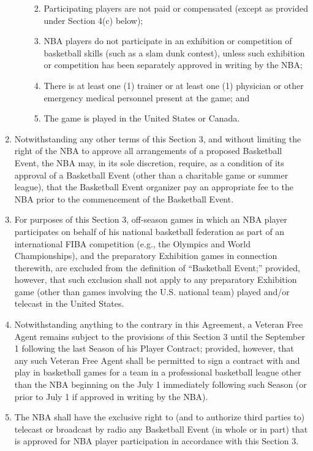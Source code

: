\documentclass[
]{book}
\providecommand{\tightlist}{%
  \setlength{\itemsep}{0pt}\setlength{\parskip}{0pt}}
\begin{document}
\begin{enumerate}
\begin{enumerate}
    \begin{enumerate}
    \def\labelenumiii{(\arabic{enumiii})}
    \tightlist
    \item
      Participating players are not paid or compensated (except as provided under Section 4(c) below);
    \item
      NBA players do not participate in an exhibition or competition of basketball skills (such as a slam dunk contest), unless such exhibition or competition has been separately approved in writing by the NBA;
    \item
      There is at least one (1) trainer or at least one (1) physician or other emergency medical personnel present at the game; and
    \item
      The game is played in the United States or Canada.
    \end{enumerate}
  \end{enumerate}
\item
  Notwithstanding any other terms of this Section 3, and without limiting the right of the NBA to approve all arrangements of a proposed Basketball Event, the NBA may, in its sole discretion, require, as a condition of its approval of a Basketball Event (other than a charitable game or summer league), that the Basketball Event organizer pay an appropriate fee to the NBA prior to the commencement of the Basketball Event.
\item
  For purposes of this Section 3, off-season games in which an NBA player participates on behalf of his national basketball federation as part of an international FIBA competition (e.g., the Olympics and World Championships), and the preparatory Exhibition games in connection therewith, are excluded from the definition of ``Basketball Event;'' provided, however, that such exclusion shall not apply to any preparatory Exhibition game (other than games involving the U.S. national team) played and/or telecast in the United States.
\item
  Notwithstanding anything to the contrary in this Agreement, a Veteran Free Agent remains subject to the provisions of this Section 3 until the September 1 following the last Season of his Player Contract; provided, however, that any such Veteran Free Agent shall be permitted to sign a contract with and play in basketball games for a team in a professional basketball league other than the NBA beginning on the July 1 immediately following such Season (or prior to July 1 if approved in writing by the NBA).
\item
  The NBA shall have the exclusive right to (and to authorize third parties to) telecast or broadcast by radio any Basketball Event (in whole or in part) that is approved for NBA player participation in accordance with this Section 3.
\end{enumerate}
\end{document}
